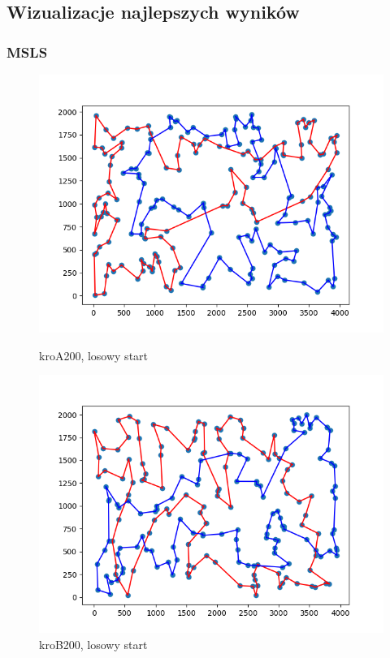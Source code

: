 \documentclass[11pt]{article}
\begin{document}
\subsection{Wizualizacje najlepszych wyników}\label{subsec:wizualizacje}

\subsubsection{MSLS}
\begin{figure}[H]
    \begin{minipage}[t]{0.45\textwidth}
        \centering
        \includegraphics[width=\linewidth]{best_paths/kroA200/MSLS}
        \caption{kroA200, losowy start}
    \end{minipage}
    \hfill
    \begin{minipage}[t]{0.45\textwidth}
        \centering
        \includegraphics[width=\linewidth]{best_paths/kroB200/MSLS}
        \caption{kroB200, losowy start}
    \end{minipage}\label{fig:figure3}
\end{figure}
\end{document}
